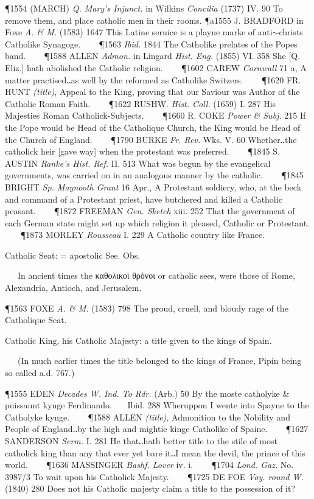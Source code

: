 \begin{description}[wide, labelwidth=!, labelindent=0pt]
\begin{myenumerate}
\P 1554 (MARCH)  \textit{Q. Mary's Injunct.} in Wilkins \textit{Concilia} (1737) IV. 90 To remove them, and place catholic men in their rooms.
\P a1555 J. BRADFORD in Foxe \textit{A. \& M.} (1583) 1647 This  Latine seruice is a playne marke of anti$\sim$christs Catholike Synagoge.    
\P 1563  \textit{Ibid.} 1844 The  Catholike prelates of the Popes band.    
\P 1588 ALLEN  \textit{Admon.} in Lingard \textit{Hist. Eng.} (1855) VI. 358 She [Q. Eliz.] hath abolished the Catholic religion.    
\P 1602 CAREW  \textit{Cornwall} 71 a, A matter practised‥as well by the reformed as Catholike Switzers.    
\P 1620 FR. HUNT  \textit{(title)}, Appeal to the King, proving that our Saviour was Author of the Catholic Roman Faith.    
\P 1622 RUSHW.  \textit{Hist. Coll.} (1659) I. 287 His Majesties Roman Catholick-Subjects.    
\P 1660 R. COKE  \textit{Power \& Subj.} 215 If the Pope would be Head of the Catholique Church, the King would be Head of the Church of England.    
\P 1790 BURKE  \textit{Fr. Rev.} Wks. V. 60 Whether‥the catholick heir [gave way] when the protestant was preferred.    
\P 1845 S. AUSTIN  \textit{Ranke's Hist. Ref.} II. 513 What was begun by the evangelical governments, was carried on in an analogous manner by the catholic.    
\P 1845 BRIGHT  \textit{Sp. Maynooth Grant} 16 Apr., A Protestant soldiery, who, at the beck and command of a Protestant priest, have butchered and killed a Catholic peasant.    
\P 1872 FREEMAN  \textit{Gen. Sketch} xiii. 252 That the government of each German state might set up which religion it pleased, Catholic or Protestant.    
\P 1873 MORLEY  \textit{Rousseau} I. 229 A Catholic country like France.

 Catholic Seat: = apostolic See. Obs.

   In ancient times the καθολικοὶ θρόνοι or catholic sees, were those of Rome, Alexandria, Antioch, and Jerusalem.

\P 1563 FOXE  \textit{A. \& M.} (1583) 798 The proud, cruell, and bloudy rage of the Catholique Seat.

 Catholic King, his Catholic Majesty: a title given to the kings of Spain.

   (In much earlier times the title belonged to the kings of France, Pipin being so called a.d. 767.)

\P 1555 EDEN  \textit{Decades W. Ind. To Rdr.} (Arb.) 50 By the moste catholyke \& puissaunt kynge Ferdinando.    Ibid. 288 Wheruppon I wente into Spayne to the Catholyke kynge.    
\P 1588 ALLEN  \textit{(title)}, Admonition to the Nobility and People of England‥by the high and mightie kinge Catholike of Spaine.    
\P 1627 SANDERSON  \textit{Serm.} I. 281 He that‥hath better title to the stile of most catholick king than any that ever yet bare it‥I mean the devil, the prince of this world.    
\P 1636 MASSINGER  \textit{Bashf. Lover} iv. i.    
\P 1704  \textit{Lond. Gaz.} No. 3987/3 To wait upon his Catholick Majesty.    
\P 1725 DE FOE  \textit{Voy. round W.} (1840) 280 Does not his Catholic majesty claim a title to the possession of it?


\end{myenumerate}
\end{description}
